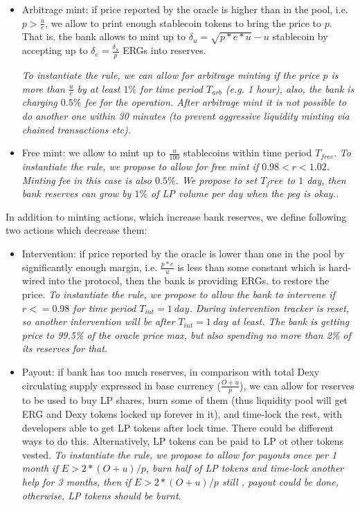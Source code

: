\documentclass{article}   %
\newcommand{\bc}{ERG}
\newcommand{\sct}{stablecoin}
\newcommand{\dx}{Dexy}
\begin{document}
\begin{itemize}
  \item{Arbitrage mint: } if price reported by the oracle is higher than in the pool, i.e. $p > \frac{u}{e}$, we allow to print enough \sct{} tokens to bring the price to $p$. That is, the bank allows to mint up to $\delta_u = \sqrt{p*e*u}-u$ \sct{} by accepting up to $\delta_e = \frac{\delta_u}{p}$ \bc{}s into reserves. 

  \em{To instantiate the rule, we can allow for arbitrage minting if the price $p$ is more than $\frac{u}{e}$ by at least $1\%$ for time period $T_{arb}$ (e.g. 1 hour), also, the bank is charging $0.5\%$ fee for the operation. After arbitrage mint it is not possible to do another one within 30 minutes (to prevent aggressive liquidity minting via chained transactions etc).} 

  \item{Free mint: } we allow to mint up to $\frac{u}{100}$ \sct{}s within time period $T_{free}$. 
  \em{To instantiate the rule, we propose to allow for free mint if $0.98 < r < 1.02$. Minting fee in this case is also $0.5\%$. We propose to set $T_free$ to $1$ day, then bank reserves can grow by $1\%$ of LP volume per day when the peg is okay.}. 
\end{itemize}  

In addition to minting actions, which increase bank reserves, we define following two actions which decrease them: 

\begin{itemize}
   \item{Intervention: } if price reported by the oracle is lower than one in the pool by significantly enough margin, i.e. $\frac{p*e}{u}$ is less than some constant which is hard-wired into the protocol, then the bank is providing \bc{}s. to restore the price.
   \em{To instantiate the rule, we propose to allow the bank to intervene if $r <= 0.98$ for time period $T_{int} = 1 {\ day}$.
       During intervention tracker is reset, so another intervention will be after $T_{int} = 1 {\ day}$ at least. The bank is getting 
       price to 99.5\% of the oracle price max, but also spending no more than 2\% of its reserves for that.}
   \item{Payout: } if bank has too much reserves, in comparison with total \dx{} circulating supply expressed in base currency ($\frac{O + u}{p}$), we can allow for reserves to be used to buy LP shares, burn some of them (thus liquidity pool will get \bc{} and \dx{} tokens locked up forever in it), and time-lock the rest, with developers able to get LP tokens after lock time. There could be different ways to do this. Alternatively, LP tokens can be paid to LP ot other tokens vested.
      \em{To instantiate the rule, we propose to allow for payouts once per 1 month if $E > 2 * (O + u) / p$, burn half of LP tokens and time-lock another help for 3 months, then if $E > 2 * (O + u) / p$ still , payout could be done, otherwise, LP tokens should be burnt.}
\end{itemize}
\end{document}
